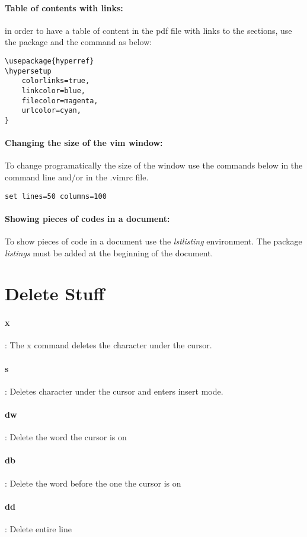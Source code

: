 \documentclass[10pt,letterpaper]{book}
\begin{document}
\paragraph{Table of contents with links:} in order to have a table of content in the pdf file with links to the sections, use the package and the command as below:\\
\begin{lstlisting}
\usepackage{hyperref}
\hypersetup
    colorlinks=true,
    linkcolor=blue,
    filecolor=magenta,
    urlcolor=cyan,
}
\end{lstlisting}
\paragraph{Changing the size of the vim window:} To change programatically the size of the window use the commands below in the command line and/or in the .vimrc file.
\begin{lstlisting}
set lines=50 columns=100
\end{lstlisting}
\paragraph{Showing pieces of codes in a document:} To show pieces of code in a document use the \emph{lstlisting} environment. The package \emph{listings} must be added at the beginning of the document.
\section{Delete Stuff}
\paragraph{x}: The x command deletes the character under the cursor.
\paragraph{s}: Deletes character under the cursor and enters insert mode.
\paragraph{dw}: Delete the word the cursor is on
\paragraph{db}: Delete the word before the one the cursor is on
\paragraph{dd}: Delete entire line
\end{document}
